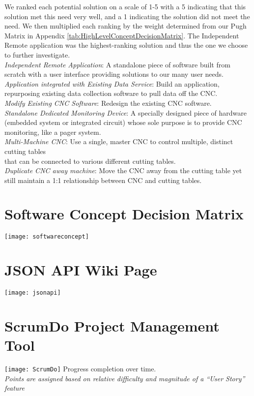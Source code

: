 \documentclass[12pt,letterpaper,titlepage]{article}
\begin{document}
\newpage
We ranked each potential solution on a scale of 1-5 with a 5 indicating that this solution met this need very well, and a 1 indicating the solution did not meet the need. We then multiplied each ranking by the weight determined from our Pugh Matrix in Appendix \ref{tab:HighLevelConceptDecisionMatrix}. The Independent Remote application was the highest-ranking solution and thus the one we choose to further investigate. \\

\noindent \emph{Independent Remote Application}: A standalone piece of software built from scratch with a user interface providing solutions to our many user needs.\\
\emph{Application integrated with Existing Data Service}: Build an application, repurposing existing data collection software to pull data off the CNC.\\
\emph{Modify Existing CNC Software}: Redesign the existing CNC software.\\
\emph{Standalone Dedicated Monitoring Device}: A specially designed piece of hardware (embedded system or integrated circuit) whose sole purpose is to provide CNC monitoring, like a pager system. \\
\emph{Multi-Machine CNC}: Use a single, master CNC to control multiple, distinct cutting tables \\
that can be connected to various different cutting tables. \\
\emph{Duplicate CNC away machine}: Move the CNC away from the cutting table yet still maintain a 1:1 relationship between CNC and cutting tables.


\newpage
\section{Software Concept Decision Matrix} \label{tab:SoftwareConceptDecisionMatrix}
\begin{center}
\texttt{[image: softwareconcept]}
\end{center}




\newpage
\section{JSON API Wiki Page} \label{sec:JSONAPIWikiPage}

\texttt{[image: jsonapi]}

\newpage
\section{ScrumDo Project Management Tool} \label{sec:AppendixScrumDo}
\begin{center}
	\texttt{[image: ScrumDo]}
	Progress completion over time. \\ \textit{Points are assigned based on relative difficulty and magnitude of a ``User Story'' feature}
\end{center}
\end{document}
